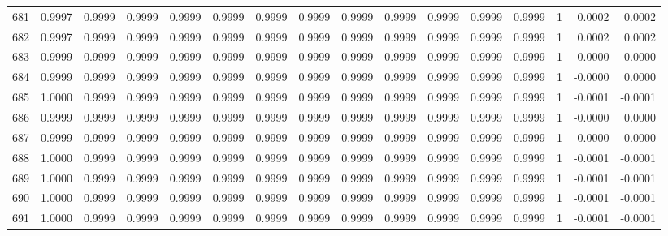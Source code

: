 \begin{tabular}{lrrrrrrrrrrrrrrr}
681 &      0.9997 &  0.9999 &  0.9999 &  0.9999 &  0.9999 &  0.9999 &  0.9999 &  0.9999 &  0.9999 &  0.9999 &   0.9999 &     0.9999 &      1 &                    0.0002 &                     0.0002 \\
682 &      0.9997 &  0.9999 &  0.9999 &  0.9999 &  0.9999 &  0.9999 &  0.9999 &  0.9999 &  0.9999 &  0.9999 &   0.9999 &     0.9999 &      1 &                    0.0002 &                     0.0002 \\
683 &      0.9999 &  0.9999 &  0.9999 &  0.9999 &  0.9999 &  0.9999 &  0.9999 &  0.9999 &  0.9999 &  0.9999 &   0.9999 &     0.9999 &      1 &                   -0.0000 &                     0.0000 \\
684 &      0.9999 &  0.9999 &  0.9999 &  0.9999 &  0.9999 &  0.9999 &  0.9999 &  0.9999 &  0.9999 &  0.9999 &   0.9999 &     0.9999 &      1 &                   -0.0000 &                     0.0000 \\
685 &      1.0000 &  0.9999 &  0.9999 &  0.9999 &  0.9999 &  0.9999 &  0.9999 &  0.9999 &  0.9999 &  0.9999 &   0.9999 &     0.9999 &      1 &                   -0.0001 &                    -0.0001 \\
686 &      0.9999 &  0.9999 &  0.9999 &  0.9999 &  0.9999 &  0.9999 &  0.9999 &  0.9999 &  0.9999 &  0.9999 &   0.9999 &     0.9999 &      1 &                   -0.0000 &                     0.0000 \\
687 &      0.9999 &  0.9999 &  0.9999 &  0.9999 &  0.9999 &  0.9999 &  0.9999 &  0.9999 &  0.9999 &  0.9999 &   0.9999 &     0.9999 &      1 &                   -0.0000 &                     0.0000 \\
688 &      1.0000 &  0.9999 &  0.9999 &  0.9999 &  0.9999 &  0.9999 &  0.9999 &  0.9999 &  0.9999 &  0.9999 &   0.9999 &     0.9999 &      1 &                   -0.0001 &                    -0.0001 \\
689 &      1.0000 &  0.9999 &  0.9999 &  0.9999 &  0.9999 &  0.9999 &  0.9999 &  0.9999 &  0.9999 &  0.9999 &   0.9999 &     0.9999 &      1 &                   -0.0001 &                    -0.0001 \\
690 &      1.0000 &  0.9999 &  0.9999 &  0.9999 &  0.9999 &  0.9999 &  0.9999 &  0.9999 &  0.9999 &  0.9999 &   0.9999 &     0.9999 &      1 &                   -0.0001 &                    -0.0001 \\
691 &      1.0000 &  0.9999 &  0.9999 &  0.9999 &  0.9999 &  0.9999 &  0.9999 &  0.9999 &  0.9999 &  0.9999 &   0.9999 &     0.9999 &      1 &                   -0.0001 &                    -0.0001 \\

\end{tabular}
